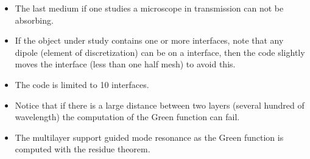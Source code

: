 \begin{itemize}

\item The last medium if one studies a microscope in transmission can
  not be absorbing.

\item If the object under study contains one or more interfaces, note
  that any dipole (element of discretization) can be on a interface,
  then the code slightly moves the interface (less than one half mesh)
  to avoid this.

\item The code is limited to 10 interfaces.

\item Notice that if there is a large distance between two layers
  (several hundred of wavelength) the computation of the Green function
  can fail.

  \item The multilayer support guided mode resonance as the Green
    function is computed with the residue theorem.

  \end{itemize}
